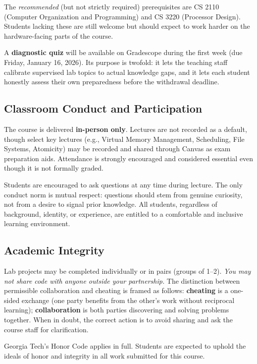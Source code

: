 \documentclass[11pt]{article}
\begin{document}
The \emph{recommended} (but not strictly required) prerequisites are CS 2110 (Computer
Organization and Programming) and CS 3220 (Processor Design). Students lacking these are still
welcome but should expect to work harder on the hardware-facing parts of the course.

A \textbf{diagnostic quiz} will be available on Gradescope during the first week (due Friday,
January 16, 2026). Its purpose is twofold: it lets the teaching staff calibrate supervised lab
topics to actual knowledge gaps, and it lets each student honestly assess their own preparedness
before the withdrawal deadline.

\subsection{Classroom Conduct and Participation}

The course is delivered \textbf{in-person only}. Lectures are not recorded as a default, though
select key lectures (e.g., Virtual Memory Management, Scheduling, File Systems, Atomicity) may
be recorded and shared through Canvas as exam preparation aids. Attendance is strongly encouraged
and considered essential even though it is not formally graded.

Students are encouraged to ask questions at any time during lecture. The only conduct norm is
mutual respect: questions should stem from genuine curiosity, not from a desire to signal prior
knowledge. All students, regardless of background, identity, or experience, are entitled to a
comfortable and inclusive learning environment.

\subsection{Academic Integrity}

Lab projects may be completed individually or in pairs (groups of 1--2). \emph{You may not share
code with anyone outside your partnership.} The distinction between permissible collaboration and
cheating is framed as follows: \textbf{cheating} is a one-sided exchange (one party benefits from
the other's work without reciprocal learning); \textbf{collaboration} is both parties discovering
and solving problems together. When in doubt, the correct action is to avoid sharing and ask the
course staff for clarification.

Georgia Tech's Honor Code applies in full. Students are expected to uphold the ideals of honor
and integrity in all work submitted for this course.
\end{document}
